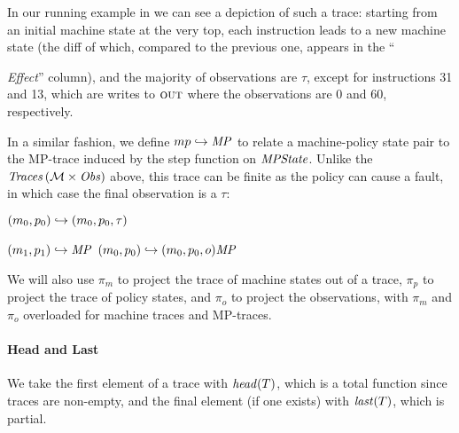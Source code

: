 \documentclass[acmsmall,review,anonymous]{acmart}\settopmatter{printfolios=true,printccs=false,printacmref=false}
\begin{document}
In our running example in  we can
see a depiction of such a trace: starting from an initial machine
state at the very top, each instruction leads to a new machine state
(the diff of which, compared to the previous one, appears in the
``{\textit{Effect}'' column), and the majority of observations are $\tau$, except
for instructions 31 and 13, which are writes to $\textsc{out}$
where the observations are $0$ and $60$, respectively.

In a similar fashion, we define \(mp \hookrightarrow \mathit{MP}\)
to relate a machine-policy state pair to the MP-trace
induced by the step function on $\mathit{MPState}$. Unlike the $\mathit{Traces}\,({\mathcal M} \times \mathit{Obs})$ above, this trace can
be finite as the policy can cause a fault, in which case the final observation is
a \(\tau\):

\begin{minipage}{.4\textwidth}
         {\((m_0,p_0) \hookrightarrow (m_0,p_0,\tau)\)}
\end{minipage}
\begin{minipage}{.55\textwidth}
              {\((m_1,p_1) \hookrightarrow \mathit{MP}\)}
              {\((m_0,p_0) \hookrightarrow
                 (m_0,p_0,o) \mathit{MP}\)}
\end{minipage}

We will also use \(\pi_m\) to project the trace of machine states
out of a trace, \(\pi_p\) to project the trace of policy states, and
\(\pi_o\) to project the observations, with \(\pi_m\) and \(\pi_o\) overloaded
for machine traces and MP-traces.

\paragraph*{Head and Last}

We take the first element of a trace with \(\mathit{head}(T)\), which is a total
function since traces are non-empty, and the final element (if one exists) with
\(\mathit{last}(T)\), which is partial.

}
\end{document}
